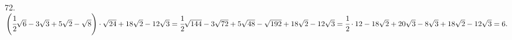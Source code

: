 72. $\left(\cfrac{1}{2}\sqrt{6}-3\sqrt{3}+5\sqrt{2}-\sqrt{8}\right)\cdot\sqrt{24}+18\sqrt{2}-12\sqrt{3}=
\cfrac{1}{2}\sqrt{144}-3\sqrt{72}+5\sqrt{48}-\sqrt{192}+18\sqrt{2}-12\sqrt{3}=
\cfrac{1}{2}\cdot12-18\sqrt{2}+20\sqrt{3}-8\sqrt{3}+18\sqrt{2}-12\sqrt{3}=6.$\\
